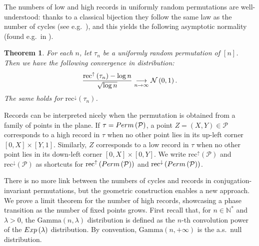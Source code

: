 \documentclass{article}
\newtheorem{theorem}{Theorem}[section]
\theoremstyle{remark}
\def\N{\mathbb{N}}
\newcommand{\cv}[2]{\underset{#1\to#2}{\longrightarrow}}
\newcommand{\Exp}[1]{{\rm Exp}\left(#1\right)}
\newcommand{\Gam}[2]{\mathrm{Gamma}\left(#1 , #2\right)}
\newcommand{\Normal}[2]{{\cal N}\left(#1 , #2\right)}
\newcommand{\hrec}[1]{\mathrm{rec}^\uparrow\left(#1\right)}
\newcommand{\lrec}[1]{\mathrm{rec}^\downarrow\left(#1\right)}
\def\pts{\mathcal{P}}
\newcommand{\perm}[1]{{\rm Perm}\left(#1\right)}
\begin{document}
The numbers of low and high records in uniformly random permutations are well-understood: thanks to a classical bijection they follow the same law as the number of cycles (see e.g.~\cite[Section~1.2]{ABNP16}), and this yields the following asymptotic normality (found e.g.~in \cite[Equation~(1.31)]{ABT03}).

\begin{theorem}\label{th: records uniform}
    For each $n$, let $\tau_n$ be a uniformly random permutation of $[n]$. 
    Then we have the following convergence in distribution:
    \begin{equation*}
        \frac{\hrec{\tau_n}-\log n}{\sqrt{\log n}} \cv{n}{\infty} \Normal{0}{1} .
    \end{equation*}
    The same holds for $\lrec{\tau_n}$.
\end{theorem}

Records can be interpreted nicely when the permutation is obtained from a family of points in the plane.
If $\tau = \perm{\pts}$, a point $Z=(X,Y)\in\pts$ corresponds to a high record in $\tau$ when no other point lies in its up-left corner $[0,X]\times[Y,1]$.
Similarly, $Z$ corresponds to a low record in $\tau$ when no other point lies in its down-left corner $[0,X]\times[0,Y]$.
We write $\hrec{\pts}$ and $\lrec{\pts}$ as shortcuts for $\hrec{\perm{\pts}}$ and $\lrec{\perm{\pts}}$.

There is no more link between the numbers of cycles and records in conjugation-invariant permutations, but the geometric construction enables a new approach.
We prove a limit theorem for the number of high records, showcasing a phase transition as the number of fixed points grows.
First recall that, for $n\in\N^*$ and $\lambda>0$, the $\Gam{n}{\lambda}$ distribution is defined as the $n$-th convolution power of the $\Exp{\lambda}$ distribution.
By convention, $\Gam{n}{+\infty}$ is the a.s.~null distribution.
\end{document}
